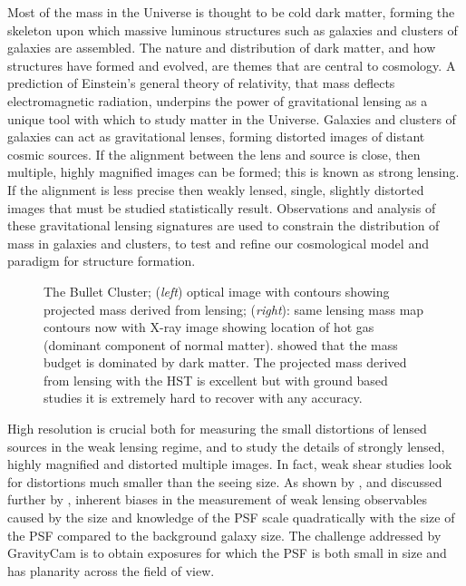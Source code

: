 \documentclass{pasa}%
\begin{document}
Most of the mass in the Universe is thought to be cold dark matter, forming the skeleton upon which massive luminous structures such as galaxies and clusters of galaxies are assembled. The nature and distribution of dark matter, and how structures have formed and evolved, are themes that are central to cosmology. A prediction of Einstein's general theory of relativity, that mass deflects electromagnetic radiation, underpins the power of gravitational lensing as a unique tool with which to study matter in the Universe. Galaxies and clusters of galaxies can act as gravitational lenses, forming distorted images of distant cosmic sources. If the alignment between the lens and source is close, then multiple, highly magnified images can be formed; this is known as strong lensing. If the alignment is less precise then weakly lensed, single, slightly distorted images that must be studied statistically result. Observations and analysis of these gravitational lensing signatures are used to constrain the distribution of mass in galaxies and clusters, to test and refine our cosmological model and paradigm for structure formation. 


\begin{figure*}
\centering
\begin{minipage}{8.5cm}
\centering
{}
\end{minipage}
\hfill
\begin{minipage}{8.5cm}
\centering
{}
\end{minipage}
\caption{The Bullet Cluster; ({\em left}) optical image with contours showing projected mass derived from lensing; ({\em right}): same lensing mass map contours now with X-ray image showing location of hot gas (dominant component of normal matter).  \citet{Clowe+2006} showed that the mass budget is dominated by dark matter.  The projected mass derived from lensing with the HST is excellent but with ground based studies it is extremely hard to recover with any accuracy.}
\label{fig:bullet}
\end{figure*}

High resolution is crucial both for measuring the small distortions of lensed sources in the weak lensing regime, and to study the details of strongly lensed, highly magnified and distorted multiple images. In fact, weak shear studies look for distortions much smaller than the seeing size. As shown by \citet{Massey+2013}, and discussed further by \citet{Cropper+2013}, inherent biases in the measurement of weak lensing observables caused by the size and knowledge of the PSF scale quadratically with the size of the PSF compared to the background galaxy size. The challenge addressed by \mbox{GravityCam} is to obtain exposures for which the PSF is both small in size and has planarity across the field of view.
\end{document}

